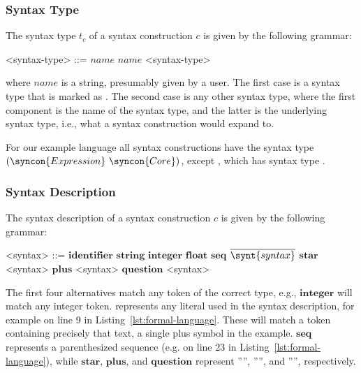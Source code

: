 \documentclass{kththesis}
\begin{document}
\subsubsection{Syntax Type}

The syntax type $t_c$ of a syntax construction $c$ is given by the following grammar:

\setlength{\grammarindent}{8em}
\begin{grammar}
<syntax-type> ::= $\mathit{name}$
  \alt $\mathit{name}$ <syntax-type>
\end{grammar}

where $\mathit{name}$ is a string, presumably given by a user. The first case is a syntax type that is marked as . The second case is any other syntax type, where the first component is the name of the syntax type, and the latter is the underlying syntax type, i.e., what a syntax construction would expand to.

For our example language all syntax constructions have the syntax type $(\syncon{Expression}\ \syncon{Core})$, except , which has syntax type .

\subsubsection{Syntax Description}

The syntax description of a syntax construction $c$ is given by the following grammar:

\newcommand{\ident}{\mathrel{\mathbf{identifier}}}
\newcommand{\integer}{\mathrel{\mathbf{integer}}}
\newcommand{\float}{\mathrel{\mathbf{float}}}
\newcommand{\seq}{\mathrel{\mathbf{seq}}}
\newcommand{\repstar}{\mathrel{\mathbf{star}}}
\newcommand{\repplus}{\mathrel{\mathbf{plus}}}
\newcommand{\repquestion}{\mathrel{\mathbf{question}}}

\setlength{\grammarindent}{6em}
\begin{grammar}
<syntax> ::= $\ident$
  \alt $\mathbf{string}$
  \alt $\integer$
  \alt $\float$
  \alt $\seq$ $\overline{\synt{syntax}}$
  \alt $\repstar$ <syntax>
  \alt $\repplus$ <syntax>
  \alt $\repquestion$ <syntax>
\end{grammar}

The first four alternatives match any token of the correct type, e.g., $\integer$ will match any integer token.  represents any literal used in the syntax description, for example  on line 9 in Listing~\ref{lst:formal-language}. These will match a token containing precisely that text, a single plus symbol in the example. $\seq$ represents a parenthesized sequence (e.g. on line 23 in Listing~\ref{lst:formal-language}), while $\repstar$, $\repplus$, and $\repquestion$ represent ''\syncon{*}'', ''\syncon{+}'', and '''', respectively.
\end{document}
